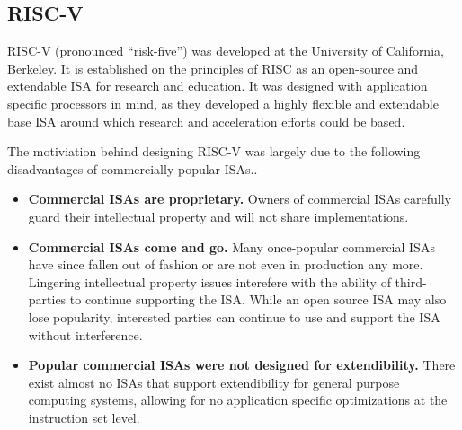 \subsection{RISC-V}

    \gls{RISC-V} (pronounced ``risk-five'') was developed at the University of California, Berkeley. It is established on the principles of RISC as an open-source and extendable \gls{ISA} for research and education. It was designed with application specific processors in mind, as they developed a highly flexible and extendable base \gls{ISA} around which research and acceleration efforts could be based.

    The motiviation behind designing RISC-V was largely due to the following disadvantages of commercially popular \glspl{ISA}.\cite{Isa2012}.
    \begin{itemize}
    \item \textbf{Commercial ISAs are proprietary.} Owners of commercial ISAs carefully guard their intellectual property and will not share implementations. 
    \item \textbf{Commercial ISAs come and go.} Many once-popular commercial ISAs have since fallen out of fashion or are not even in production any more. Lingering intellectual property issues interefere with the ability of third-parties to continue supporting the ISA. While an open source \gls{ISA} may also lose popularity, interested parties can continue to use and support the ISA without interference.
    \item \textbf{Popular commercial ISAs were not designed for extendibility.} There exist almost no ISAs that support extendibility for general purpose computing systems, allowing for no application specific optimizations at the instruction set level.
    \end{itemize}

    
